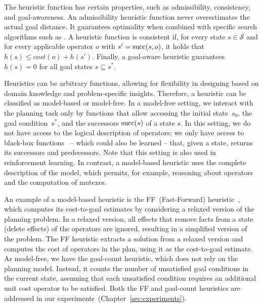 The heuristic function has certain properties, such as admissibility, consistency, and goal-awareness. An admissibility heuristic function never overestimates the actual goal distance. It guarantees optimality when combined with specific search algorithms such as \astar. A heuristic function is consistent if, for every state $s \in \mathcal{S}$ and for every applicable operator $o$ with $s' = \operatorname{succ}(s,o)$, it holds that $h(s) \leq cost(o) + h(s')$. Finally, a goal-aware heuristic guarantees $h(s) = 0$ for all goal states $s \subseteq s^*$.

Heuristics can be arbitrary functions, allowing for flexibility in designing based on domain knowledge and problem-specific insights. Therefore, a heuristic can be classified as model-based or model-free. In a model-free setting, we interact with the planning task only by functions that allow accessing the initial state~$s_0$, the goal condition~$s^*$, and the successors $\operatorname{succ}(s)$ of a state $s$. In this setting, we do not have access to the logical description of operators; we only have access to black-box functions~\cite{Sturtevant2019} -- which could also be learned -- that, given a state, returns its successors and predecessors. Note that this setting is also used in reinforcement learning.
In contrast, a model-based heuristic uses the complete description of the model, which permits, for example, reasoning about operators and the computation of mutexes.

An example of a model-based heuristic is the FF~(Fast-Forward) heuristic~\cite{Hoffmann.Nebel/2001}, which computes its cost-to-goal estimates by considering a relaxed version of the planning problem. In a relaxed version, all effects that remove facts from a state (delete effects) of the operators are ignored, resulting in a simplified version of the problem. The FF heuristic extracts a solution from a relaxed version and computes the cost of operators in the plan, using it as the cost-to-goal estimate. As model-free, we have the goal-count heuristic, which does not rely on the planning model. Instead, it counts the number of unsatisfied goal conditions in the current state, assuming that each unsatisfied condition requires an additional unit cost operator to be satisfied. Both the FF and goal-count heuristics are addressed in our experiments~(Chapter~\ref{sec:experiments}).


